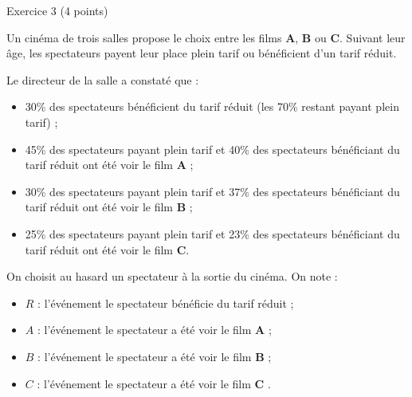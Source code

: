
%
\begin{h2}Exercice 3 (4 points)\end{h2}
\par
Un cinéma de trois salles propose le choix entre les films \textbf{A}, \textbf{B} ou \textbf{C}. Suivant leur âge, les spectateurs payent leur place plein tarif ou bénéficient d'un tarif réduit.
\par
Le directeur de la salle a constaté que :
\par
\begin{itemize}
     \item 30\% des spectateurs bénéficient du tarif réduit (les 70\% restant payant plein tarif) ;
     \item 45\% des spectateurs payant plein tarif et 40\% des spectateurs bénéficiant du tarif réduit ont été voir le film \textbf{A} ;
     \item 30\% des spectateurs payant plein tarif et 37\% des spectateurs bénéficiant du tarif réduit ont été voir le film \textbf{B} ;
     \item 25\% des spectateurs payant plein tarif et 23\% des spectateurs bénéficiant du tarif réduit ont été voir le film \textbf{C}.
\end{itemize}
\par
On choisit au hasard un spectateur à la sortie du cinéma. On note :
\par
\begin{itemize}
     \item $R$ : l'événement \og le spectateur bénéficie du tarif réduit \fg{} ;
     \item $A$ : l'événement \og le spectateur a été voir le film \textbf{A} \fg{} ;
     \item $B$ : l'événement \og le spectateur a été voir le film \textbf{B} \fg{} ;
     \item $C$ : l'événement \og le spectateur a été voir le film \textbf{C} \fg{}.
\end{itemize}
\par
